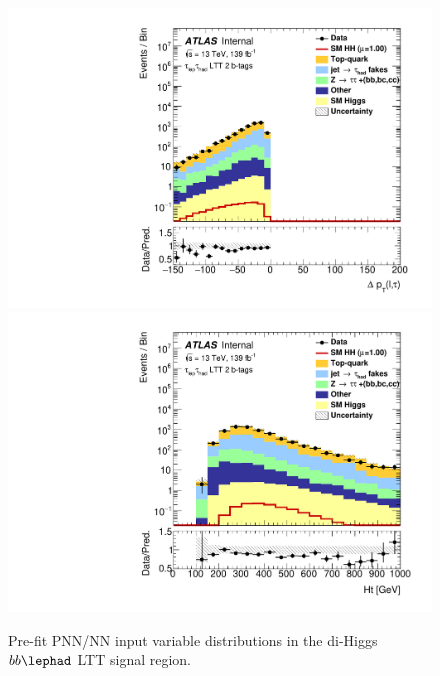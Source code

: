 \begin{figure}
\includegraphics[width=.32\textwidth]{figures/mva/HH/LepHad/LTT/Region_BMin0_incJet1_distdPtLepTau_J2_D_T2_SpcTauLH_Y2015_LTT1_L1_Prefitlog.pdf}
\includegraphics[width=.32\textwidth]{figures/mva/HH/LepHad/LTT/Region_BMin0_incJet1_distHt_J2_D_T2_SpcTauLH_Y2015_LTT1_L1_Prefitlog.pdf}
\caption{Pre-fit PNN/NN input variable distributions in the di-Higgs $bb\lephad$ LTT signal region.}
\label{fig:lephadmvainputsltt}
\end{figure}

